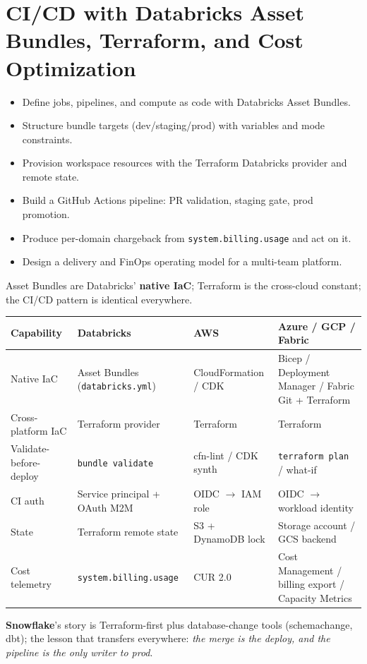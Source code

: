 \chapter{CI/CD with Databricks Asset Bundles, Terraform, and Cost Optimization}
%
%
\begin{objectives}
\begin{itemize}
    \item Define jobs, pipelines, and compute as code with Databricks Asset Bundles.
    \item Structure bundle targets (dev/staging/prod) with variables and mode constraints.
    \item Provision workspace resources with the Terraform Databricks provider and remote state.
    \item Build a GitHub Actions pipeline: PR validation, staging gate, prod promotion.
    \item Produce per-domain chargeback from \texttt{system.billing.usage} and act on it.
    \item Design a delivery and FinOps operating model for a multi-team platform.
\end{itemize}
\end{objectives}

\begin{crosscloud}
Asset Bundles are Databricks' \textbf{native IaC}; Terraform is the cross-cloud constant; the
CI/CD pattern is identical everywhere.

\vspace{2mm}
{\footnotesize
\begin{tabular}{@{}p{3.0cm}p{3.4cm}p{3.2cm}p{3.2cm}@{}}
\toprule
\textbf{Capability} & \textbf{Databricks} & \textbf{AWS} & \textbf{Azure / GCP / Fabric} \\
\midrule
Native IaC & Asset Bundles (\texttt{databricks.yml}) & CloudFormation / CDK & Bicep / Deployment Manager / Fabric Git + Terraform \\
Cross-platform IaC & Terraform provider & Terraform & Terraform \\
Validate-before-deploy & \texttt{bundle validate} & cfn-lint / CDK synth & \texttt{terraform plan} / what-if \\
CI auth & Service principal + OAuth M2M & OIDC $\rightarrow$ IAM role & OIDC $\rightarrow$ workload identity \\
State & Terraform remote state & S3 + DynamoDB lock & Storage account / GCS backend \\
Cost telemetry & \texttt{system.billing.usage} & CUR 2.0 & Cost Management / billing export / Capacity Metrics \\
\bottomrule
\end{tabular}}

\vspace{1mm}
\textbf{Snowflake}'s story is Terraform-first plus database-change tools (schemachange, dbt);
the lesson that transfers everywhere: \emph{the merge is the deploy, and the pipeline is the only
writer to prod}.
\end{crosscloud}

